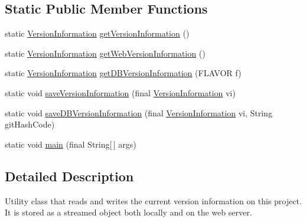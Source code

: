 \subsection*{Static Public Member Functions}
\begin{DoxyCompactItemize}
\item 
static \hyperlink{classgov_1_1fnal_1_1ppd_1_1dd_1_1util_1_1version_1_1VersionInformation}{Version\-Information} \hyperlink{classgov_1_1fnal_1_1ppd_1_1dd_1_1util_1_1version_1_1VersionInformation_ae3b271fb533ff507acae7aeccbe4ffef}{get\-Version\-Information} ()
\item 
static \hyperlink{classgov_1_1fnal_1_1ppd_1_1dd_1_1util_1_1version_1_1VersionInformation}{Version\-Information} \hyperlink{classgov_1_1fnal_1_1ppd_1_1dd_1_1util_1_1version_1_1VersionInformation_a35a9492897005a8a48cfd9289dc9edff}{get\-Web\-Version\-Information} ()
\item 
static \hyperlink{classgov_1_1fnal_1_1ppd_1_1dd_1_1util_1_1version_1_1VersionInformation}{Version\-Information} \hyperlink{classgov_1_1fnal_1_1ppd_1_1dd_1_1util_1_1version_1_1VersionInformation_afccd7186968a5736b034f8600df1287b}{get\-D\-B\-Version\-Information} (F\-L\-A\-V\-O\-R f)
\item 
static void \hyperlink{classgov_1_1fnal_1_1ppd_1_1dd_1_1util_1_1version_1_1VersionInformation_ad92c421c9291308bc422e9b383b0fc4d}{save\-Version\-Information} (final \hyperlink{classgov_1_1fnal_1_1ppd_1_1dd_1_1util_1_1version_1_1VersionInformation}{Version\-Information} vi)
\item 
static void \hyperlink{classgov_1_1fnal_1_1ppd_1_1dd_1_1util_1_1version_1_1VersionInformation_afaa42342d99f1517e1a672b24f1f725a}{save\-D\-B\-Version\-Information} (final \hyperlink{classgov_1_1fnal_1_1ppd_1_1dd_1_1util_1_1version_1_1VersionInformation}{Version\-Information} vi, String git\-Hash\-Code)
\item 
static void \hyperlink{classgov_1_1fnal_1_1ppd_1_1dd_1_1util_1_1version_1_1VersionInformation_a1f1c0fa39067225a137925368674d424}{main} (final String\mbox{[}$\,$\mbox{]} args)
\end{DoxyCompactItemize}


\subsection{Detailed Description}
Utility class that reads and writes the current version information on this project. It is stored as a streamed object both locally and on the web server.

